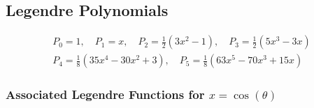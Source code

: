 \subsection{Legendre Polynomials}
\begin{footnotesize}
    \noindent\begin{gather*}
        P_{0} =1, \quad P_{1}=x,\quad P_{2}=\frac{1}{2}(3x^{2}-1), \quad P_{3}  =\frac{1}{2}(5x^{3}-3x)\\
        P_{4} =\frac{1}{8}(35x^{4}-30x^{2}+3), \quad P_{5} =\frac{1}{8}(63x^{5}-70x^{3}+15x)
    \end{gather*}
\end{footnotesize}

\subsubsection[Associated Legendre Functions]{Associated Legendre Functions for $x=\cos(\theta)$}

